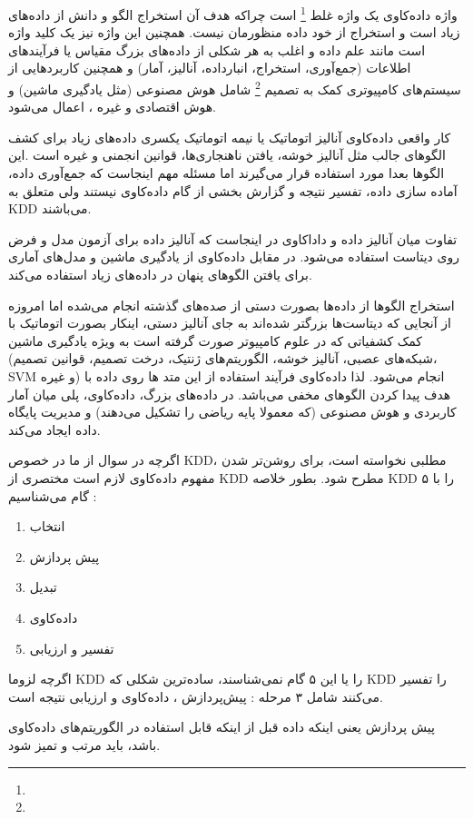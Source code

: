 \documentclass[a4paper, 12pt]{article}
\begin{document}
واژه داده‌کاوی یک واژه غلط 
\footnote{}
است چراکه هدف آن استخراج الگو و دانش از داده‌های زیاد است و استخراج از خود داده منظورمان نیست.  همچنین این واژه نیز یک کلید واژه است مانند علم داده و اغلب به هر شکلی از داده‌های بزرگ مقیاس یا فرآیند‌های اطلاعات (جمع‌آوری، استخراج، انبارداده، آنالیز، آمار) و همچنین کاربرد‌هایی از سیستم‌های کامپیوتری کمک به تصمیم
\footnote{}
شامل هوش مصنوعی (مثل یادگیری ماشین) و هوش اقتصادی و غیره ، اعمال می‌شود.

کار واقعی داده‌کاوی آنالیز اتوماتیک یا نیمه اتوماتیک یکسری داده‌های زیاد برای کشف الگوهای جالب  مثل آنالیز خوشه، یافتن ناهنجاری‌ها، قوانین انجمنی و غیره است .این الگو‌ها بعدا مورد استفاده قرار می‌گیرند اما مسئله مهم اینجاست که جمع‌آوری داده، آماده سازی داده، تفسیر نتیجه و گزارش بخشی از گام داده‌کاوی نیستند ولی متعلق به KDD می‌باشند. 

تفاوت میان آنالیز داده و دادا‌کاوی در اینجاست که آنالیز داده برای آزمون مدل و فرض روی دیتاست استفاده می‌شود. در مقابل داده‌کاوی از یادگیری ماشین و مدل‌های آماری برای یافتن الگو‌های پنهان در داده‌های زیاد استفاده می‌کند.

استخراج الگوها از داده‌ها بصورت دستی از صده‌های گذشته انجام می‌شده اما امروزه از آنجایی که دیتاست‌ها بزرگتر شده‌اند به جای آنالیز دستی، اینکار بصورت اتوماتیک با کمک کشفیاتی که در علوم کامپیوتر صورت گرفته است به ویژه یادگیری ماشین (شبکه‌های عصبی، آنالیز خوشه، الگوریتم‌های ژنتیک، درخت تصمیم، قوانین تصمیم، SVM و غیره) انجام می‌شود. لذا داده‌کاوی فرآیند استفاده از این متد ها روی داده با هدف پیدا کردن الگو‌های مخفی می‌باشد. در داده‌های بزرگ، داده‌کاوی، پلی میان آمار کاربردی و هوش مصنوعی (که معمولا پایه ریاضی را تشکیل می‌دهند) و مدیریت پایگاه داده ایجاد می‌کند. 

اگرچه در سوال از ما در خصوص KDD، مطلبی نخواسته است، برای روشن‌تر شدن مفهوم داده‌کاوی لازم‌ است مختصری از KDD مطرح شود. بطور خلاصه KDD را با ۵ گام می‌شناسیم :
\begin{enumerate}
	\item
	 انتخاب 
	\item
	پیش پردازش
	\item
	تبدیل
	\item
	داده‌کاوی
	\item
	تفسیر و ارزیابی
\end{enumerate} 
 اگرچه لزوما KDD را یا این ۵ گام نمی‌شناسند، ساده‌ترین شکلی که KDD را تفسیر می‌کنند شامل ۳ مرحله : پیش‌پردازش ، داده‌کاوی و ارزیابی نتیجه است.
 
 پیش پردازش یعنی اینکه داده قبل از اینکه قابل استفاده در الگوریتم‌های داده‌کاوی باشد، باید مرتب و تمیز شود.
 
\end{document}
